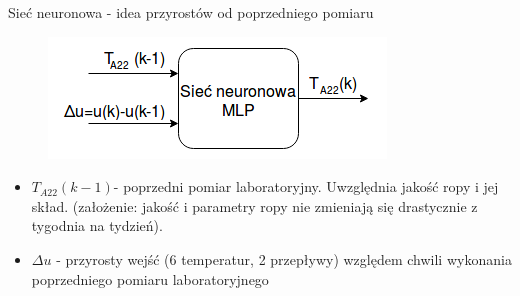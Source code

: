 \documentclass{beamer}
\begin{document}
\begin{frame}{Sieć neuronowa - idea przyrostów od poprzedniego pomiaru}
\begin{figure}
	\includegraphics[width=\linewidth]{diagram_nn}
\end{figure}

	\begin{itemize}
		\item $T_{A22}(k-1)$- poprzedni pomiar laboratoryjny. Uwzględnia jakość ropy i jej skład. (założenie: jakość i parametry ropy nie zmieniają się drastycznie z tygodnia na tydzień).
		\item $\Delta u$ - przyrosty wejść (6 temperatur, 2 przepływy) względem chwili wykonania poprzedniego pomiaru laboratoryjnego
	\end{itemize}

\end{frame}
\end{document}
